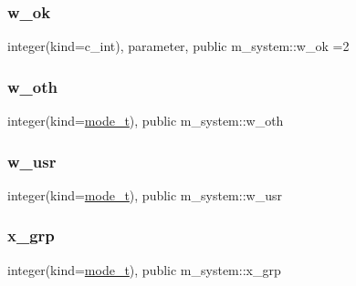 \subsubsection{\texorpdfstring{w\+\_\+ok}{w\_ok}}
{\footnotesize\ttfamily integer(kind=c\+\_\+int), parameter, public m\+\_\+system\+::w\+\_\+ok =2}

\mbox{\label{namespacem__system_a82b69c635bb9cd191b867efdf2003d9b}} 
\subsubsection{\texorpdfstring{w\+\_\+oth}{w\_oth}}
{\footnotesize\ttfamily integer(kind=\mbox{\hyperlink{namespacem__system_abdb5cc27c945379d844db4830d499050}{mode\+\_\+t}}), public m\+\_\+system\+::w\+\_\+oth}

\mbox{\label{namespacem__system_ace39a3c0b26d21381c2956b78a8822d5}} 
\subsubsection{\texorpdfstring{w\+\_\+usr}{w\_usr}}
{\footnotesize\ttfamily integer(kind=\mbox{\hyperlink{namespacem__system_abdb5cc27c945379d844db4830d499050}{mode\+\_\+t}}), public m\+\_\+system\+::w\+\_\+usr}

\mbox{\label{namespacem__system_ae405a76caed1088a151c437d66d80eb0}} 
\subsubsection{\texorpdfstring{x\+\_\+grp}{x\_grp}}
{\footnotesize\ttfamily integer(kind=\mbox{\hyperlink{namespacem__system_abdb5cc27c945379d844db4830d499050}{mode\+\_\+t}}), public m\+\_\+system\+::x\+\_\+grp}

\mbox{\label{namespacem__system_a0eca0d5b431ad6fbde6f40407550e7aa}} 
